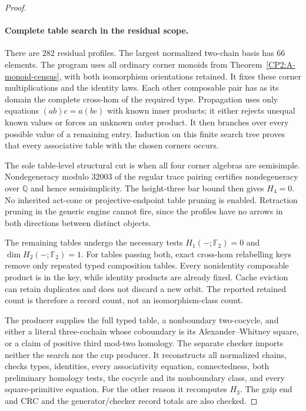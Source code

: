 \begin{proof}
\paragraph{Complete table search in the residual scope.}
There are $282$ residual profiles.  The largest normalized
two-chain basis has $66$ elements.  The program
 uses all ordinary
corner monoids from Theorem~\ref{CP2:A-monoid-census}, with
both isomorphism orientations retained.  It fixes these
corner multiplications and the identity laws.  Each other
composable pair has as its domain the complete cross-hom
of the required type.  Propagation uses only equations
$(ab)c=a(bc)$ with known inner products; it either rejects
unequal known values or forces an unknown outer product.
It then branches over every possible value of a remaining
entry.  Induction on this finite search tree proves that
every associative table with the chosen corners occurs.

The sole table-level structural cut is when all four
corner algebras are semisimple.  Nondegeneracy modulo
$32003$ of the regular trace pairing certifies
nondegeneracy over $\mathbb Q$ and hence semisimplicity.
The height-three bar bound then gives $H_4=0$.
No inherited act-cone or projective-endpoint table pruning
is enabled.  Retraction pruning in the generic engine
cannot fire, since the profiles have no arrows in both
directions between distinct objects.

The remaining tables undergo the necessary tests
$H_1(-;\mathbb F_2)=0$ and $\dim H_2(-;\mathbb F_2)=1$.
For tables passing both, exact cross-hom relabelling keys
remove only repeated typed composition tables.  Every
nonidentity composable product is in the key, while
identity products are already fixed.  Cache eviction can
retain duplicates and does not discard a new orbit.
The reported retained count is therefore a record count,
not an isomorphism-class count.

The producer supplies the full typed table, a nonboundary
two-cocycle, and either a literal three-cochain whose
coboundary is its Alexander--Whitney square, or a claim of
positive third mod-two homology.  The separate checker
 imports neither
the search nor the cup producer.  It reconstructs all
normalized chains, checks types, identities, every
associativity equation, connectedness, both preliminary
homology tests, the cocycle and its nonboundary class,
and every square-primitive equation.  For the other
reason it recomputes $H_3$.  The gzip end and CRC and the
generator/checker record totals are also checked.


\end{proof}
